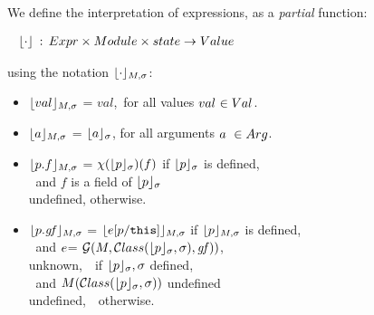\begin{definition}[Interpretations]
We define the interpretation of expressions, as a {\em partial} function:

\noindent
$
\begin{array}{c}
\  {\lfloor{ {\cdot}}\rfloor_{}}\, : \, {{Expr}} \times   {Module} \times   {state}
\rightarrow {Value}
 \end{array}
$

\noindent
using the notation  ${\lfloor{ {\cdot}}\rfloor_{M,\sigma}}$: \\


\begin{itemize}
\item
 ${\lfloor{ {val}}\rfloor_{M,\sigma}} $    = $val$,\  for all values $val\ {\in {Val}}$.
\item
 ${\lfloor{ {{a}}}\rfloor_{M,\sigma}} $    = ${\lfloor{ {{a}{} }}\rfloor_{\sigma}}${, for all arguments $a\ \in {Arg}$}.
 \item
 {${{\lfloor{ {p{\bf {.}}f}}\rfloor_{M,\sigma}} } $} = $ {\chi({\lfloor{ {p}}\rfloor_{\sigma}})(f)}$  {if} ${\lfloor{ {p}}\rfloor_{\sigma}}$
  is defined,
  \\   $~$ \hspace{.2in}  and  $f$ is a field of ${\lfloor{ {p}}\rfloor_{\sigma}}$
\\
undefined,  otherwise.
\item
{$ {\lfloor{ {p{\bf {.}}\mathit{gf}}}\rfloor_{M,\sigma}}$} = $ {\lfloor{ {e[p/{\ensuremath{\textrm{\ttfamily{this}}}}]}}\rfloor_{M,\sigma}} $ if  ${\lfloor{ {p}}\rfloor_{M,\sigma}}$
 is defined,  \\
 $~ $   \hspace{.2in}  and  ${e}$= ${\cal G}(M,{\cal C}lass({\lfloor{ {p}}\rfloor_{\sigma}}, \sigma),\mathit{gf}))$,
\\ {unknown,}\ \  if ${\lfloor{ {p}}\rfloor_{\sigma}}, \sigma$ defined, \\
$~ $   \hspace{.2in}  and
$M({\cal C}lass({\lfloor{ {p}}\rfloor_{\sigma}}, \sigma))$   undefined
\\  undefined,\ \    otherwise.


\end{itemize}
\end{definition}
